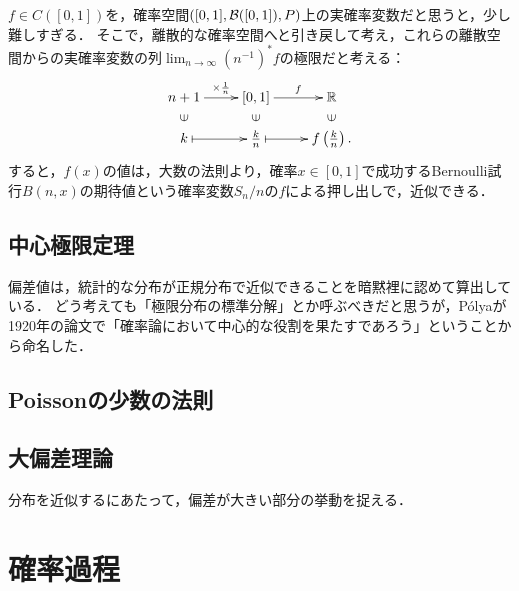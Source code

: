 \documentclass[uplatex,dvipdfmx]{jsreport}
\begin{document}
\begin{remarks}
    $f\in C([0,1])$を，確率空間$([0,1],\mathcal{B}([0,1]),P)$上の実確率変数だと思うと，少し難しすぎる．
    そこで，離散的な確率空間へと引き戻して考え，これらの離散空間からの実確率変数の列$\lim_{n\to\infty}(n^{-1})^*f$の極限だと考える：
    \[\xymatrix@R-2pc{
        n+1\ar[r]^-{\times\frac{1}{n}}&[0,1]\ar[r]^-{f}&\R\\
        \rotatebox[origin=c]{90}{$\in$}&\rotatebox[origin=c]{90}{$\in$}&\rotatebox[origin=c]{90}{$\in$}\\
        k\ar@{|->}[r]&\frac{k}{n}\ar@{|->}[r]&f\paren{\frac{k}{n}}.
    }\]
    すると，$f(x)$の値は，大数の法則より，確率$x\in[0,1]$で成功するBernoulli試行$B(n,x)$の期待値という確率変数$S_n/n$の$f$による押し出しで，近似できる．
\end{remarks}

\section{中心極限定理}

\begin{tcolorbox}[colframe=ForestGreen, colback=ForestGreen!10!white,breakable,colbacktitle=ForestGreen!40!white,coltitle=black,fonttitle=\bfseries\sffamily,
title=]
    偏差値は，統計的な分布が正規分布で近似できることを暗黙裡に認めて算出している．
    どう考えても「極限分布の標準分解」とか呼ぶべきだと思うが，Pólyaが1920年の論文で「確率論において中心的な役割を果たすであろう」ということから命名した．
\end{tcolorbox}

\section{Poissonの少数の法則}

\section{大偏差理論}

\begin{tcolorbox}[colframe=ForestGreen, colback=ForestGreen!10!white,breakable,colbacktitle=ForestGreen!40!white,coltitle=black,fonttitle=\bfseries\sffamily,
    title=]
        分布を近似するにあたって，偏差が大きい部分の挙動を捉える．
\end{tcolorbox}





\chapter{確率過程}
\end{document}
